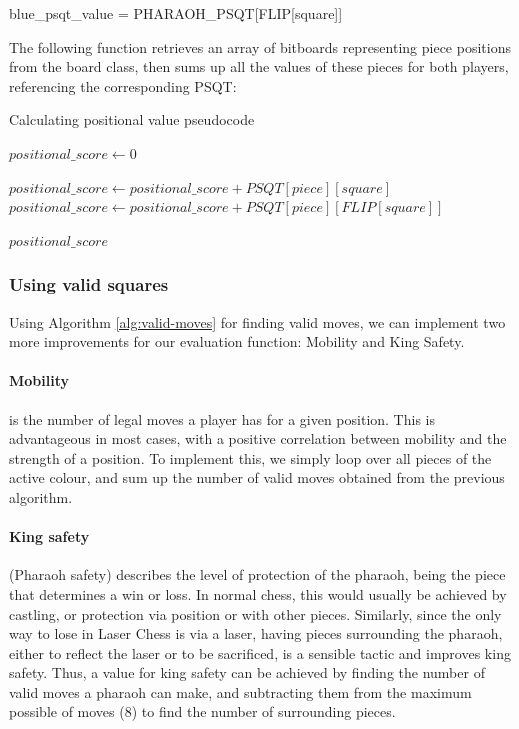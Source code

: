 \documentclass[../main/main.tex]{subfiles}
\begin{document}
\begin{center}
blue\_psqt\_value = PHARAOH\_PSQT[FLIP[square]]
\end{center}

The following function retrieves an array of bitboards representing piece positions from the board class, then sums up all the values of these pieces for both players, referencing the corresponding PSQT:

\begin{algorithm}[H]
\caption{Calculating positional value pseudocode}
\begin{algorithmic}
    \State $positional\_score \gets 0$

                    \State $positional\_score \gets positional\_score + PSQT[piece][square]$
                \Else
                    \State $positional\_score \gets positional\_score + PSQT[piece][FLIP[square]]$
                \EndIf
            \EndIf
        \EndFor
    \EndFor

    \State \Return $positional\_score$
    \EndFunction
\end{algorithmic}
\end{algorithm}

\subsubsection*{Using valid squares}
Using Algorithm \ref{alg:valid-moves} for finding valid moves, we can implement two more improvements for our evaluation function: Mobility and King Safety.

\paragraph{Mobility} is the number of legal moves a player has for a given position. This is advantageous in most cases, with a positive correlation between mobility and the strength of a position. To implement this, we simply loop over all pieces of the active colour, and sum up the number of valid moves obtained from the previous algorithm.

\paragraph{King safety} (Pharaoh safety) describes the level of protection of the pharaoh, being the piece that determines a win or loss. In normal chess, this would usually be achieved by castling, or protection via position or with other pieces. Similarly, since the only way to lose in Laser Chess is via a laser, having pieces surrounding the pharaoh, either to reflect the laser or to be sacrificed, is a sensible tactic and improves king safety. Thus, a value for king safety can be achieved by finding the number of valid moves a pharaoh can make, and subtracting them from the maximum possible of moves (8) to find the number of surrounding pieces.
\end{document}

